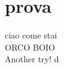 \documentclass{article}
\begin{document}
    \section{prova}
        ciao come stai\\
        ORCO BOIO\\
        Another try! d
\end{document}
